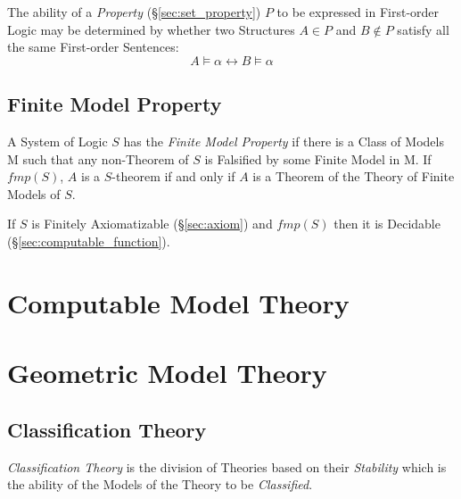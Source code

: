 The ability of a \emph{Property} (\S\ref{sec:set_property}) $P$ to
be expressed in First-order Logic may be determined by whether two
Structures $A \in P$ and $B \notin P$ satisfy all the same First-order
Sentences:
\[
    A \vDash \alpha \leftrightarrow B \vDash \alpha
\]



\subsection{Finite Model Property}

A System of Logic $S$ has the \emph{Finite Model Property} if there is
a Class of Models $\mathrm{M}$ such that any non-Theorem of $S$ is
Falsified by some Finite Model in $\mathrm{M}$. If $fmp(S)$, $A$ is a
$S$-theorem if and only if $A$ is a Theorem of the Theory of Finite
Models of $S$.

If $S$ is Finitely Axiomatizable (\S\ref{sec:axiom}) and $fmp(S)$ then
it is Decidable (\S\ref{sec:computable_function}).



\section{Computable Model Theory}\label{sec:computable_model_theory}

\cite{harizanov98}



\section{Geometric Model Theory}

\subsection{Classification Theory}

\emph{Classification Theory} is the division of Theories based on
their \emph{Stability} which is the ability of the Models of the
Theory to be \emph{Classified}.



